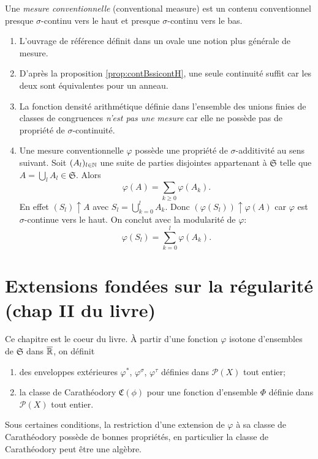 \begin{defi}
Une \emph{mesure conventionnelle} (conventional measure) est un contenu conventionnel presque $\sigma$-continu vers le haut et presque $\sigma$-continu vers le bas.
\end{defi}

\begin{rems}
 \begin{enumerate}
  \item L'ouvrage de référence définit dans un ovale une notion plus générale de mesure.
  \item D'après la proposition \ref{prop:contBssicontH}, une seule  continuité suffit car les deux sont équivalentes pour un anneau.
  \item La fonction densité arithmétique définie dans l'ensemble des unions finies de classes de congruences \emph{n'est pas une mesure} car elle ne possède pas de propriété de $\sigma$-continuité.
  \item Une mesure conventionnelle $\varphi$ possède une propriété de $\sigma$-additivité au sens suivant.\newline
  Soit $(A_l)_{l \in \mathbb{N}}$ une suite de parties disjointes appartenant à $\mathfrak{S}$ telle que $A = \bigcup_l A_l \in \mathfrak{S}$. Alors
  \begin{displaymath}
   \varphi(A) = \sum_{k\geq 0} \varphi(A_k).
  \end{displaymath}
En effet $(S_l)\uparrow A$ avec $S_l = \bigcup_{k=0}^l A_k$. Donc $(\varphi(S_l))\uparrow \varphi (A)$ car $\varphi$ est $\sigma$-continue vers le haut. On conclut avec la modularité de $\varphi$:
\begin{displaymath}
 \varphi(S_l) = \sum_{k=0}^{l} \varphi(A_k).
\end{displaymath}
 \end{enumerate}
\end{rems}

\chapter{Extensions fondées sur la régularité \small{(chap II du livre)}}\label{ExtenRegul}
Ce chapitre est le coeur du livre. À partir d'une fonction $\varphi$ isotone d'ensembles de $\mathfrak{S}$ dans $\overline{\mathbb{R}}$, on définit
\begin{enumerate}
 \item des enveloppes extérieures $\varphi^*$, $\varphi^\sigma$, $\varphi^\tau$ définies dans $\mathcal{P}(X)$ tout entier;
 \item la classe de Carathéodory $\mathfrak{C}(\phi)$ pour une fonction d'ensemble $\Phi$ définie dans $\mathcal{P}(X)$ tout entier.
\end{enumerate}
Sous certaines conditions, la restriction d'une extension de $\varphi$ à sa classe de Carathéodory possède de bonnes propriétés, en particulier la classe de Carathéodory peut être une algèbre.

